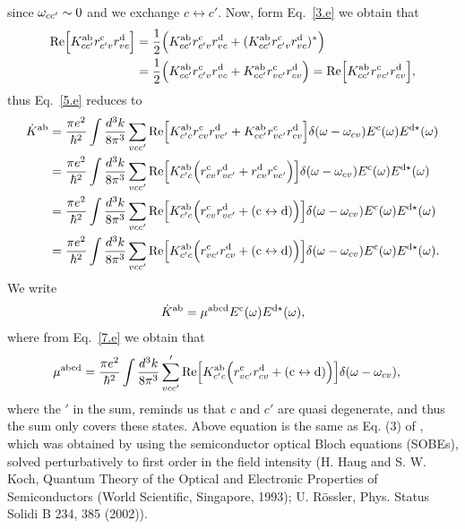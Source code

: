 \documentclass[floatfix,prb,aps,superscriptaddress,11pt]{revtex4}
\begin{document}
since $\omega_{cc'}\sim 0$ and we exchange $c\leftrightarrow c'$. Now,
form Eq.~\eqref{3.e} we obtain that
\begin{align}\label{6.2}
\mathrm{Re}
\Big[ 
K^{\mathrm{a}\mathrm{b}}_{cc'}
r^{\mathrm{c}}_{c'v}r^{\mathrm{d}}_{vc}
\Big]
&
=\frac{1}{2}\Big(
K^{\mathrm{a}\mathrm{b}}_{cc'}
r^{\mathrm{c}}_{c'v}r^{\mathrm{d}}_{vc}
+
(K^{\mathrm{a}\mathrm{b}}_{cc'}
r^{\mathrm{c}}_{c'v}r^{\mathrm{d}}_{vc})^*
\Big) 
\nonumber\\
&=\frac{1}{2}\Big(
K^{\mathrm{a}\mathrm{b}}_{cc'}
r^{\mathrm{c}}_{c'v}r^{\mathrm{d}}_{vc}
+
K^{\mathrm{a}\mathrm{b}}_{cc'}
r^{\mathrm{c}}_{vc'}r^{\mathrm{d}}_{cv}
\Big) 
=\mathrm{Re}
\Big[
K^{\mathrm{a}\mathrm{b}}_{cc'}
r^{\mathrm{c}}_{vc'}r^{\mathrm{d}}_{cv}
\Big]
,
\end{align}
thus Eq.~\eqref{5.e} reduces to
\begin{align}\label{7.e}
\dot K^{\mathrm{a}\mathrm{b}}
&=
\frac{\pi e^2}{\hbar^2}
\int\frac{d^3k}{8\pi^3}
\sum_{vcc'}
\mathrm{Re}
\Big[
K^{\mathrm{a}\mathrm{b}}_{c'c}
r^{\mathrm{c}}_{cv}r^{\mathrm{d}}_{vc'}
+
K^{\mathrm{a}\mathrm{b}}_{cc'}
r^{\mathrm{c}}_{vc'}r^{\mathrm{d}}_{cv}
\Big]
\delta(\omega-\omega_{cv}) 
E^{\mathrm{c}}(\omega)E^{\mathrm{d}\star}(\omega) 
\nonumber\\
&=
\frac{\pi e^2}{\hbar^2}
\int\frac{d^3k}{8\pi^3}
\sum_{vcc'}
\mathrm{Re}\Big[
K^{\mathrm{a}\mathrm{b}}_{c'c}
\Big(
r^{\mathrm{c}}_{cv}r^{\mathrm{d}}_{vc'}
+
r^{\mathrm{d}}_{cv} r^{\mathrm{c}}_{vc'}
\Big) 
\Big]
\delta(\omega-\omega_{cv}) 
E^{\mathrm{c}}(\omega)E^{\mathrm{d}\star}(\omega) 
\nonumber\\
&=
\frac{\pi e^2}{\hbar^2}
\int\frac{d^3k}{8\pi^3}
\sum_{vcc'}
\mathrm{Re}\Big[
K^{\mathrm{a}\mathrm{b}}_{c'c}
\Big(
r^{\mathrm{c}}_{cv}r^{\mathrm{d}}_{vc'}
+
(\mathrm{c}\leftrightarrow\mathrm{d}) 
\Big) 
\Big]
\delta(\omega-\omega_{cv}) 
E^{\mathrm{c}}(\omega)E^{\mathrm{d}\star}(\omega) 
\nonumber\\
&=
\frac{\pi e^2}{\hbar^2}
\int\frac{d^3k}{8\pi^3}
\sum_{vcc'}
\mathrm{Re}\Big[
K^{\mathrm{a}\mathrm{b}}_{c'c}
\Big(
r^{\mathrm{c}}_{vc'} r^{\mathrm{d}}_{cv}
+
(\mathrm{c}\leftrightarrow\mathrm{d}) 
\Big) 
\Big]
\delta(\omega-\omega_{cv}) 
E^{\mathrm{c}}(\omega)E^{\mathrm{d}\star}(\omega) 
.
\end{align} 
We write
 \begin{align}\label{8.e}
\dot K^{\mathrm{a}\mathrm{b}}
=
\mu^{\mathrm{abcd}} 
E^{\mathrm{c}}(\omega)E^{\mathrm{d}\star}(\omega) 
,
\end{align}
where from Eq.~\eqref{7.e} we obtain that
\begin{align}\label{9.e}
\mu^{\mathrm{abcd}}
&=
\frac{\pi e^2}{\hbar^2}
\int\frac{d^3k}{8\pi^3}
\sum'_{vcc'}
\mathrm{Re}\Big[ 
K^{\mathrm{a}\mathrm{b}}_{c'c}
\Big( 
r^{\mathrm{c}}_{vc'} r^{\mathrm{d}}_{cv}
+
(\mathrm{c}\leftrightarrow\mathrm{d}) 
\Big) 
\Big]
\delta(\omega-\omega_{cv}) 
,  
\end{align}
where the $'$ in the sum, reminds us that $c$ and $c'$ are quasi
degenerate, and thus the sum only covers these states.
Above equation is the same as Eq. (3) of \cite{bhatPRL05}, which was
obtained by  using the semiconductor optical Bloch equations (SOBEs),
solved perturbatively to first order in the field intensity 
(H. Haug and S. W. Koch, Quantum Theory of the Optical
and Electronic Properties of Semiconductors (World Scientific,
Singapore, 1993); U. R\"ossler, Phys. Status Solidi B 234, 385 (2002)). 
  
\end{document}
